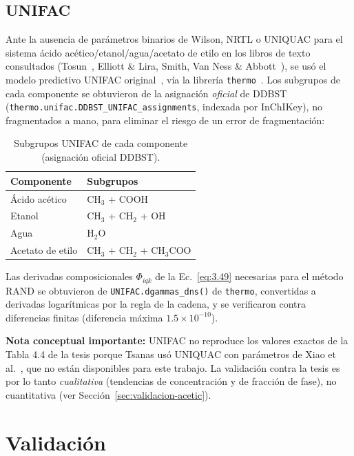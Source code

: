 \documentclass[11pt,a4paper]{article}
\begin{document}
\subsection{UNIFAC}

Ante la ausencia de parámetros binarios de Wilson, NRTL o UNIQUAC para
el sistema ácido acético/etanol/agua/acetato de etilo en los libros de
texto consultados (Tosun~\citep{tosun2013},
Elliott \& Lira, Smith, Van Ness \&
Abbott~\citep{smithvannessabbott}), se usó el modelo predictivo UNIFAC
original~\citep{fredenslund1975}, vía la librería
\texttt{thermo}~\citep{bellthermo}. Los subgrupos de cada componente se
obtuvieron de la asignación \emph{oficial} de DDBST
(\texttt{thermo.unifac.DDBST\_UNIFAC\_assignments}, indexada por
InChIKey), no fragmentados a mano, para eliminar el riesgo de un error
de fragmentación:

\begin{table}[h]
\centering
\caption{Subgrupos UNIFAC de cada componente (asignación oficial DDBST).}
\begin{tabular}{@{}ll@{}}
\toprule
Componente & Subgrupos \\
\midrule
Ácido acético & CH$_3$ + COOH \\
Etanol & CH$_3$ + CH$_2$ + OH \\
Agua & H$_2$O \\
Acetato de etilo & CH$_3$ + CH$_2$ + CH$_3$COO \\
\bottomrule
\end{tabular}
\end{table}

Las derivadas composicionales $\Phi_{iqk}$ de la Ec.~\eqref{eq:3.49}
necesarias para el método RAND se obtuvieron de
\texttt{UNIFAC.dgammas\_dns()} de \texttt{thermo}, convertidas a
derivadas logarítmicas por la regla de la cadena, y se verificaron
contra diferencias finitas (diferencia máxima $1.5\times 10^{-10}$).

\textbf{Nota conceptual importante:} UNIFAC no reproduce los valores
exactos de la Tabla 4.4 de la tesis porque Tsanas usó UNIQUAC con
parámetros de Xiao et al.~\citep{xiao1989}, que no están disponibles
para este trabajo. La validación contra la tesis es por lo tanto
\emph{cualitativa} (tendencias de concentración y de fracción de fase),
no cuantitativa (ver Sección~\ref{sec:validacion-acetic}).

\section{Validación}
\label{sec:validacion}
\end{document}
